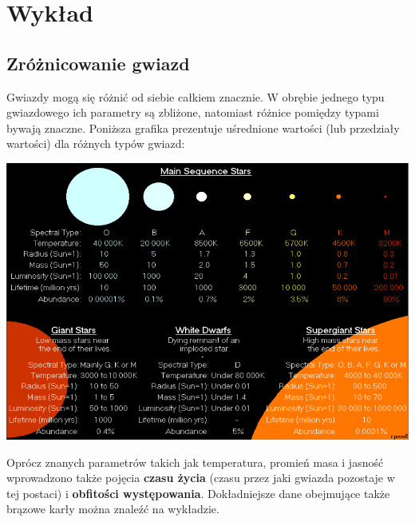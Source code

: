 \documentclass[../index.tex]{subfiles}
\begin{document}
    \section{Wykład}
        \subsection{Zróżnicowanie gwiazd}
            Gwiazdy mogą się różnić od siebie całkiem znacznie. W obrębie jednego typu gwiazdowego ich parametry są zbliżone, natomiast różnice pomiędzy typami bywają znaczne. Poniższa grafika prezentuje uśrednione wartości (lub przedziały wartości) dla różnych typów gwiazd:
            \begin{center}
                \includegraphics[width=15cm]{images/parametryGwiazd.png}
            \end{center}
            Oprócz znanych parametrów takich jak temperatura, promień masa i jasność wprowadzono także pojęcia \textbf{czasu życia} (czasu przez jaki gwiazda pozostaje w tej postaci) i \textbf{obfitości występowania}. Dokładniejsze dane obejmujące także brązowe karły można znaleźć na wykładzie.
\end{document}
